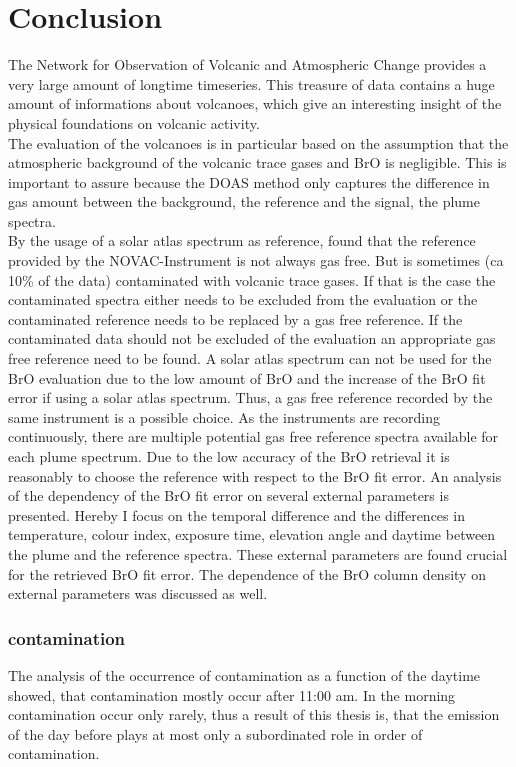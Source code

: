 \documentclass  [
  paper    = a4,
  BCOR     = 10mm,
  twoside,
  fontsize = 12pt,
  fleqn,
  toc      = bibnumbered,
  toc      = listofnumbered,
  numbers  = noendperiod,
  headings = normal,
  listof   = leveldown,
  version  = 3.03
]                                       {scrreprt}
\begin{document}
	\chapter{Conclusion}
	
	The Network for Observation of Volcanic and Atmospheric Change provides a very large amount of longtime timeseries. This treasure of data contains a huge amount of informations about volcanoes, which give an interesting insight of the physical foundations on volcanic activity.\\
	The evaluation of the volcanoes is in particular based on the assumption that the atmospheric background of the volcanic trace gases  and BrO is negligible. This is important to assure because the DOAS method only captures the difference in gas amount between the background, the reference and the signal, the plume spectra.\\
	By the usage of a solar atlas spectrum as reference, \citet{lubcke2016retrieval} found  that the reference provided by the NOVAC-Instrument is not always gas free. But is sometimes (ca 10\% of the data) contaminated with volcanic trace gases. If that is the case the contaminated spectra either needs to be excluded from the evaluation or the contaminated reference needs to be replaced by a gas free reference. If the contaminated data should not be excluded of the evaluation an appropriate gas free reference  need to be found. A solar atlas spectrum can not be used for the BrO evaluation due to the low amount of BrO and the increase of the BrO fit error if using a solar atlas spectrum. Thus, a gas free reference recorded by the same instrument is a possible choice.
	As the instruments are recording continuously, there are multiple potential gas free reference spectra available for each plume spectrum. Due to the low accuracy of the BrO retrieval it is reasonably to choose the reference with respect to the BrO fit error.
	An analysis of the dependency of the BrO fit error on several external parameters is presented. Hereby I focus on the temporal difference and the differences in temperature, colour index, exposure time, elevation angle and daytime between the plume and the reference spectra. These external parameters are found crucial for the retrieved BrO fit error. The dependence of the BrO column density on external parameters was discussed as well.
	\subsection*{ contamination}
	 The analysis of the occurrence of contamination as a function of the daytime showed, that contamination mostly occur after 11:00 am. In the morning contamination occur only rarely, thus a result of this thesis is, that the emission of the day before plays at most only a subordinated role in order of  contamination. 
\end{document}
